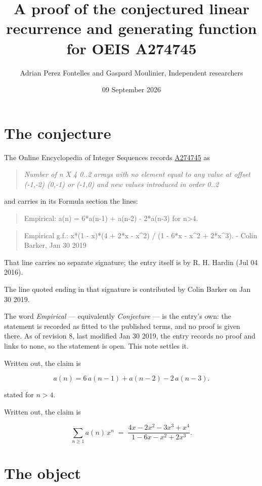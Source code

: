 \documentclass[11pt]{article}
\title{A proof of the conjectured linear recurrence and generating function for OEIS A274745}
\author{Adrian Perez Fontelles and Gaspard Moulinier, Independent researchers}
\date{09 September 2026}
\theoremstyle{definition}
\begin{document}
\maketitle
\section{The conjecture}

The Online Encyclopedia of Integer Sequences records \href{https://oeis.org/A274745}{A274745} as

\begin{quote}\itshape Number of n X 4 0..2 arrays with no element equal to any value at offset (-1,-2) (0,-1) or (-1,0) and new values introduced in order 0..2\end{quote}

and carries in its Formula section the lines:

\begin{quote}\ttfamily Empirical: a(n) = 6*a(n-1) + a(n-2) - 2*a(n-3) for n>4.\end{quote}

\begin{quote}\ttfamily Empirical g.f.: x*(1 - x)*(4 + 2*x - x\textasciicircum{}2) / (1 - 6*x - x\textasciicircum{}2 + 2*x\textasciicircum{}3). - Colin Barker, Jan 30 2019\end{quote}

That line carries no separate signature; the entry itself is by R. H. Hardin (Jul 04 2016).

The line quoted ending in that signature is contributed by Colin Barker on Jan 30 2019.

The word {\itshape Empirical} --- equivalently {\itshape Conjecture} --- is the entry's own: the statement is recorded as fitted to the published terms, and no proof is given there. As of revision 8, last modified Jan 30 2019, the entry records no proof and links to none, so the statement is open. This note settles it.

Written out, the claim is

\[a(n) = 6\,a(n-1) + a(n-2) - 2\,a(n-3).\]

stated for $n > 4$.

Written out, the claim is

\[\sum_{n \ge 1} a(n)\,x^n \;=\; \frac{4x - 2x^{2} - 3x^{3} + x^{4}}{1 - 6x - x^{2} + 2x^{3}}.\]

\section{The object}
\end{document}
